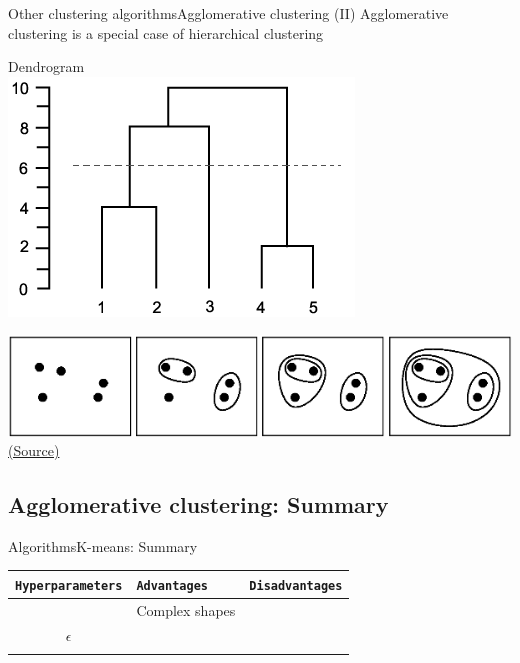 \documentclass[10pt,compress]{beamer} %
\begin{document}
\begin{frame}{Other clustering algorithms}{Agglomerative clustering (II)}
    Agglomerative clustering is a special case of hierarchical clustering
    
    \bigskip

	\centering Dendrogram\\ \includegraphics[width=0.5\linewidth]{figs/dendrogram.png}

	\includegraphics[width=0.7\linewidth]{figs/agglomerative.png}\\
	\scriptsize\href{https://stackoverflow.com/questions/8016313/agglomerative-clustering-in-matlab}{(Source)}
\end{frame}


\subsection{Agglomerative clustering: Summary}
\begin{frame}[fragile]{Algorithms}{K-means: Summary}
	\begin{center}
	\begin{tabular}{cll}\hline
	 	\texttt{Hyperparameters}  & \texttt{Advantages}  & \texttt{Disadvantages} \\\hline
	 	                 & Complex shapes                &  \\
	    $\epsilon$       &         &  \\
	 	                 &         &  \\
	 	\hline
	\end{tabular}
	\end{center}
\end{frame}
\end{document}
